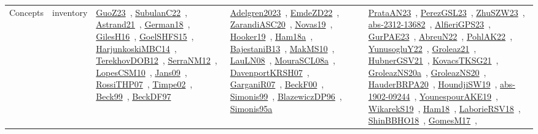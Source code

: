 {\begin{longtable}{lp{3cm}>{\raggedright\arraybackslash}p{6cm}>{\raggedright\arraybackslash}p{6cm}>{\raggedright\arraybackslash}p{8cm}}
Concepts & inventory & \href{works/GuoZ23.pdf}{GuoZ23}~\cite{GuoZ23}, \href{works/SubulanC22.pdf}{SubulanC22}~\cite{SubulanC22}, \href{works/Astrand21.pdf}{Astrand21}~\cite{Astrand21}, \href{works/German18.pdf}{German18}~\cite{German18}, \href{works/GilesH16.pdf}{GilesH16}~\cite{GilesH16}, \href{works/GoelSHFS15.pdf}{GoelSHFS15}~\cite{GoelSHFS15}, \href{works/HarjunkoskiMBC14.pdf}{HarjunkoskiMBC14}~\cite{HarjunkoskiMBC14}, \href{works/TerekhovDOB12.pdf}{TerekhovDOB12}~\cite{TerekhovDOB12}, \href{works/SerraNM12.pdf}{SerraNM12}~\cite{SerraNM12}, \href{works/LopesCSM10.pdf}{LopesCSM10}~\cite{LopesCSM10}, \href{works/Jans09.pdf}{Jans09}~\cite{Jans09}, \href{works/RossiTHP07.pdf}{RossiTHP07}~\cite{RossiTHP07}, \href{works/Timpe02.pdf}{Timpe02}~\cite{Timpe02}, \href{works/Beck99.pdf}{Beck99}~\cite{Beck99}, \href{works/BeckDF97.pdf}{BeckDF97}~\cite{BeckDF97} & \href{works/Adelgren2023.pdf}{Adelgren2023}~\cite{Adelgren2023}, \href{works/EmdeZD22.pdf}{EmdeZD22}~\cite{EmdeZD22}, \href{works/ZarandiASC20.pdf}{ZarandiASC20}~\cite{ZarandiASC20}, \href{works/Novas19.pdf}{Novas19}~\cite{Novas19}, \href{works/Hooker19.pdf}{Hooker19}~\cite{Hooker19}, \href{works/Ham18a.pdf}{Ham18a}~\cite{Ham18a}, \href{works/BajestaniB13.pdf}{BajestaniB13}~\cite{BajestaniB13}, \href{works/MakMS10.pdf}{MakMS10}~\cite{MakMS10}, \href{works/LauLN08.pdf}{LauLN08}~\cite{LauLN08}, \href{works/MouraSCL08a.pdf}{MouraSCL08a}~\cite{MouraSCL08a}, \href{works/DavenportKRSH07.pdf}{DavenportKRSH07}~\cite{DavenportKRSH07}, \href{works/GarganiR07.pdf}{GarganiR07}~\cite{GarganiR07}, \href{works/BeckF00.pdf}{BeckF00}~\cite{BeckF00}, \href{works/Simonis99.pdf}{Simonis99}~\cite{Simonis99}, \href{works/BlazewiczDP96.pdf}{BlazewiczDP96}~\cite{BlazewiczDP96}, \href{works/Simonis95a.pdf}{Simonis95a}~\cite{Simonis95a} & \href{works/PrataAN23.pdf}{PrataAN23}~\cite{PrataAN23}, \href{works/PerezGSL23.pdf}{PerezGSL23}~\cite{PerezGSL23}, \href{works/ZhuSZW23.pdf}{ZhuSZW23}~\cite{ZhuSZW23}, \href{works/abs-2312-13682.pdf}{abs-2312-13682}~\cite{abs-2312-13682}, \href{works/AlfieriGPS23.pdf}{AlfieriGPS23}~\cite{AlfieriGPS23}, \href{works/GurPAE23.pdf}{GurPAE23}~\cite{GurPAE23}, \href{works/AbreuN22.pdf}{AbreuN22}~\cite{AbreuN22}, \href{works/PohlAK22.pdf}{PohlAK22}~\cite{PohlAK22}, \href{works/YunusogluY22.pdf}{YunusogluY22}~\cite{YunusogluY22}, \href{works/Groleaz21.pdf}{Groleaz21}~\cite{Groleaz21}, \href{works/HubnerGSV21.pdf}{HubnerGSV21}~\cite{HubnerGSV21}, \href{works/KovacsTKSG21.pdf}{KovacsTKSG21}~\cite{KovacsTKSG21}, \href{works/GroleazNS20a.pdf}{GroleazNS20a}~\cite{GroleazNS20a}, \href{works/GroleazNS20.pdf}{GroleazNS20}~\cite{GroleazNS20}, \href{works/HauderBRPA20.pdf}{HauderBRPA20}~\cite{HauderBRPA20}, \href{works/HoundjiSW19.pdf}{HoundjiSW19}~\cite{HoundjiSW19}, \href{works/abs-1902-09244.pdf}{abs-1902-09244}~\cite{abs-1902-09244}, \href{works/YounespourAKE19.pdf}{YounespourAKE19}~\cite{YounespourAKE19}, \href{works/WikarekS19.pdf}{WikarekS19}~\cite{WikarekS19}, \href{works/Ham18.pdf}{Ham18}~\cite{Ham18}, \href{works/LaborieRSV18.pdf}{LaborieRSV18}~\cite{LaborieRSV18}, \href{works/ShinBBHO18.pdf}{ShinBBHO18}~\cite{ShinBBHO18}, \href{works/GomesM17.pdf}{GomesM17}~\cite{GomesM17}, 
\end{longtable}}
